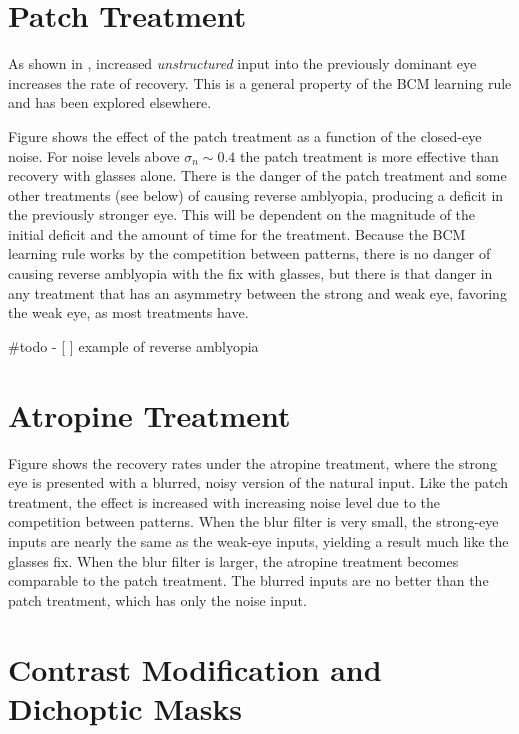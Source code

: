 \documentclass[
  letterpaper,
  number]{elsarticle}
\begin{document}
\hypertarget{patch-treatment-1}{%
\section*{Patch Treatment}\label{patch-treatment-1}}

As shown in \citep{sec:results}, increased \emph{unstructured} input
into the previously dominant eye increases the rate of recovery. This is
a general property of the BCM learning rule and has been explored
elsewhere\citep{BlaisEtAl99}.

Figure \citep{fig:dODI_patch_vs_noise} shows the effect of the patch
treatment as a function of the closed-eye noise. For noise levels above
\(\sigma_n \sim 0.4\) the patch treatment is more effective than
recovery with glasses alone. There is the danger of the patch treatment
and some other treatments (see below) of causing reverse amblyopia,
producing a deficit in the previously stronger eye. This will be
dependent on the magnitude of the initial deficit and the amount of time
for the treatment. Because the BCM learning rule works by the
competition between patterns, there is no danger of causing reverse
amblyopia with the fix with glasses, but there is that danger in any
treatment that has an asymmetry between the strong and weak eye,
favoring the weak eye, as most treatments have.

\#todo - {[} {]} example of reverse amblyopia

\hypertarget{atropine-treatment-1}{%
\section*{Atropine Treatment}\label{atropine-treatment-1}}

Figure \citep{fig:dODI_atropine_vs_blur} shows the recovery rates under
the atropine treatment, where the strong eye is presented with a
blurred, noisy version of the natural input. Like the patch treatment,
the effect is increased with increasing noise level due to the
competition between patterns. When the blur filter is very small, the
strong-eye inputs are nearly the same as the weak-eye inputs, yielding a
result much like the glasses fix. When the blur filter is larger, the
atropine treatment becomes comparable to the patch treatment. The
blurred inputs are no better than the patch treatment, which has only
the noise input.

\hypertarget{contrast-modification-and-dichoptic-masks}{%
\section*{Contrast Modification and Dichoptic
Masks}\label{contrast-modification-and-dichoptic-masks}}
\end{document}

